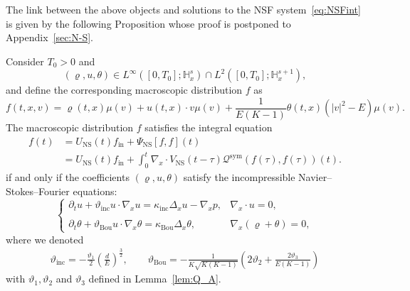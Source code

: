 \documentclass[10pt]{amsart}
\theoremstyle{definition}\newtheorem{defi}[theo]{Definition}\newtheorem{rema}[theo]{Remark}\newtheorem{exam}[theo]{Example}\newtheorem{exem}[theo]{Example}\newtheorem{nota}[theo]{Notation}
\newcommand{\ini}{\mathrm{in}}
\newcommand{\ns}{\mathrm{NS}}
\newcommand{\sym}{\mathrm{sym}}
\newcommand{\Inc}{\mathrm{inc}}
\newcommand{\Bou}{\mathrm{Bou}}
\newcommand{\bbH}{\mathbb{H}}
\newcommand{\QQ}{\mathcal{Q}}
\begin{document}
The link between the above objects and solutions to the NSF system~\eqref{eq:NSFint} is given by the following Proposition whose proof is postponed to Appendix~\ref{sec:N-S}.

\begin{prop}\label{prop:equivalence_kinetic_hydrodynamic_INSF}
Consider $T_0 > 0$ and
\[
(\varrho, u, \theta) \in L^\infty\left([0, T_0] ; \bbH^s_x \right) \cap L^2\left([0, T_0] ;\bbH^{s+1}_x \right),
\]
and define the corresponding macroscopic distribution $f$ as
\begin{equation}\label{eq:f-macro}
f(t, x, v) = \varrho(t, x) \mu(v) + u(t, x) \cdot v \mu(v) + \frac{1}{E(K-1)} \theta(t, x) \left(|v|^2 - E \right) \mu(v).
\end{equation}
The macroscopic distribution $f$ satisfies the integral equation
\begin{equation}
\begin{split}\label{eq:NS-IntVNS}
f(t) & = U_\ns(t) f_\ini + \Psi_\ns\left[f, f \right](t) \\
& = U_\ns(t) f_\ini + \int_0^t \nabla_x \cdot V_\ns(t-\tau) \QQ^\sym (f(\tau), f(\tau))(t).
\end{split}
\end{equation}
if and only if the coefficients $(\varrho, u, \theta)$ satisfy the incompressible Navier--Stokes--Fourier equations:
\[
\begin{cases}
\partial_t u + \vartheta_\Inc u \cdot \nabla_x u = \kappa_\Inc \Delta_x u - \nabla_x p, & \nabla_x \cdot u = 0, \\
\\
\partial_t \theta + \vartheta_\Bou u \cdot \nabla_x \theta = \kappa_\Bou \Delta_x \theta, & \nabla_x (\varrho + \theta) = 0,
\end{cases}
\]
where we denoted
\begin{gather*}
\vartheta_\Inc = - \frac{\vartheta_1}{2} \left(\frac{d}{E} \right)^{\frac{3}{2}}, \qquad
\vartheta_\Bou = -\frac{1}{ K \sqrt{K(K-1)} } \left(2 \vartheta_2 + \frac{2 \vartheta_3}{E (K-1)} \right)
\end{gather*}
with $\vartheta_1,\vartheta_2$ and $\vartheta_3$ defined in Lemma~\ref{lem:Q_A}.
\end{prop}
\end{document}
